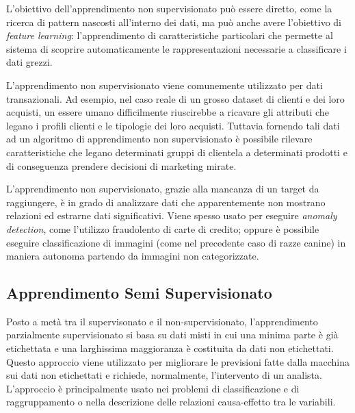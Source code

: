 L'obiettivo dell'apprendimento non supervisionato può essere diretto, come la ricerca di pattern nascosti all'interno dei dati, ma può anche avere l'obiettivo di \textit{feature learning}: l'apprendimento di caratteristiche particolari che permette al sistema di scoprire automaticamente le rappresentazioni necessarie a classificare i dati grezzi.

L'apprendimento non supervisionato viene comunemente utilizzato per dati transazionali. Ad esempio, nel caso reale di un grosso dataset di clienti e dei loro acquisti, un essere umano difficilmente riuscirebbe a ricavare gli attributi che legano i profili clienti e le tipologie dei loro acquisti. Tuttavia fornendo tali dati ad un algoritmo di  apprendimento non supervisionato è possibile rilevare caratteristiche che legano determinati gruppi di clientela a determinati prodotti e di conseguenza prendere decisioni di marketing mirate.

L'apprendimento non supervisionato, grazie alla mancanza di un target da raggiungere, è in grado di analizzare dati che   apparentemente non mostrano relazioni ed estrarne dati significativi. Viene spesso usato per eseguire \textit{anomaly detection}, come l'utilizzo fraudolento di carte di credito; oppure è possibile eseguire classificazione di immagini (come nel precedente caso di razze canine) in maniera autonoma partendo da immagini non categorizzate.

\subsection{Apprendimento Semi Supervisionato}
Posto a metà tra il supervisonato e il non-supervisionato, l'apprendimento parzialmente supervisionato si basa su dati misti in cui una minima parte è già etichettata e una larghissima maggioranza è costituita da dati non etichettati.  Questo approccio viene utilizzato per migliorare le previsioni fatte dalla macchina sui dati non etichettati e richiede, normalmente, l'intervento di un analista. L'approccio è principalmente usato nei problemi di classificazione e di raggruppamento o nella descrizione delle relazioni causa-effetto tra le variabili.

